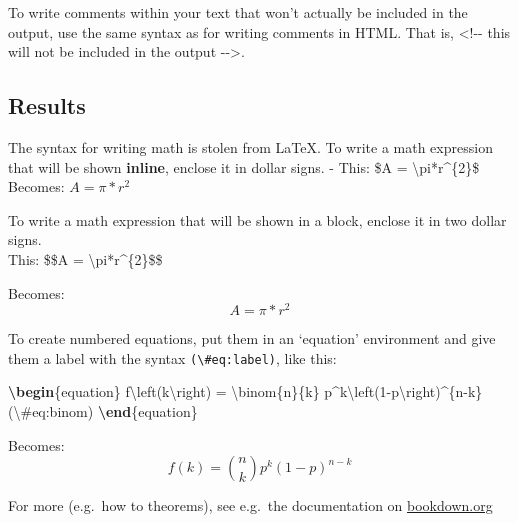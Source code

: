 \documentclass[a4paper, twoside]{templates/ociamthesis}
\newenvironment{Shaded}{\begin{snugshade}}{\end{snugshade}}
\newcommand{\ExtensionTok}[1]{#1}
\newcommand{\KeywordTok}[1]{\textcolor[rgb]{0.13,0.29,0.53}{\textbf{#1}}}
\newcommand{\NormalTok}[1]{#1}
\newcommand{\SpecialCharTok}[1]{\textcolor[rgb]{0.00,0.00,0.00}{#1}}
\newcommand{\SpecialStringTok}[1]{\textcolor[rgb]{0.31,0.60,0.02}{#1}}
\renewenvironment{Shaded}
{
  \vspace{4pt}%
  \begin{snugshade}%
}{%
  \end{snugshade}%
  \vspace{4pt}%
}
\begin{document}
To write comments within your text that won't actually be included in the output, use the same syntax as for writing comments in HTML. That is, \textless!-\/- this will not be included in the output -\/-\textgreater.

\hypertarget{results-2}{%
\subsection{Results}\label{results-2}}

The syntax for writing math is stolen from LaTeX. To write a math expression that will be shown \textbf{inline}, enclose it in dollar signs.
- This: \$A = \textbackslash pi*r\^{}\{2\}\$ Becomes: \(A = \pi*r^{2}\)

To write a math expression that will be shown in a block, enclose it in two dollar signs.\\
This: \$\$A = \textbackslash pi*r\^{}\{2\}\$\$

Becomes:
\[A = \pi*r^{2}\]

To create numbered equations, put them in an `equation' environment and give them a label with the syntax \texttt{(\textbackslash{}\#eq:label)}, like this:

\begin{Shaded}
\begin{Highlighting}[]
\KeywordTok{\textbackslash{}begin}\NormalTok{\{}\ExtensionTok{equation}\NormalTok{\}}\SpecialStringTok{ }
\SpecialStringTok{  f}\SpecialCharTok{\textbackslash{}left}\SpecialStringTok{(k}\SpecialCharTok{\textbackslash{}right}\SpecialStringTok{) = }\SpecialCharTok{\textbackslash{}binom}\SpecialStringTok{\{n\}\{k\} p\^{}k}\SpecialCharTok{\textbackslash{}left}\SpecialStringTok{(1{-}p}\SpecialCharTok{\textbackslash{}right}\SpecialStringTok{)\^{}\{n{-}k\}}
\SpecialStringTok{  (}\SpecialCharTok{\textbackslash{}\#}\SpecialStringTok{eq:binom)}
\KeywordTok{\textbackslash{}end}\NormalTok{\{}\ExtensionTok{equation}\NormalTok{\} }
\end{Highlighting}
\end{Shaded}

Becomes:
\begin{equation}
f\left(k\right)=\binom{n}{k}p^k\left(1-p\right)^{n-k}
\label{eq:binom}
\end{equation}

For more (e.g.~how to theorems), see e.g.~the documentation on \href{https://bookdown.org/yihui/bookdown/markdown-extensions-by-bookdown.html\#equations}{bookdown.org}
\end{document}
